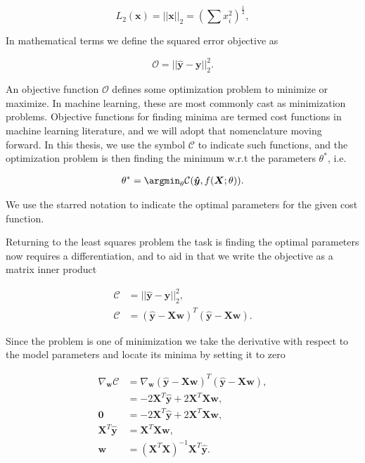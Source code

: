 $$L_2(\boldsymbol{x}) =||\boldsymbol{x}||_2 = \left(\sum x_i^2\right)^{\frac{1}{2}},$$

\noindent  In mathematical terms we define the squared error objective as

\begin{equation}
\mathcal{O} = || \boldsymbol{\hat{y}} - \boldsymbol{y} ||_2 ^2.
\end{equation}

\noindent An objective function $\mathcal{O}$ defines some optimization problem to minimize or maximize. In machine learning, these are most commonly cast as minimization problems. Objective functions for finding minima are termed cost functions in machine learning literature, and we will adopt that nomenclature moving forward. In this thesis, we use the symbol $\mathcal{C}$ to indicate such functions, and the optimization problem is then finding the minimum w.r.t the parameters $\theta^*$, i.e. 

\begin{align}\label{eq:cost}
\theta^* = \argmin_\theta \mathcal{C}(\boldsymbol{\hat{y}}, f(\boldsymbol{X}; \theta)).
\end{align}

\noindent We use the starred notation to indicate the optimal parameters for the given cost function.

Returning to the least squares problem the task is finding the optimal parameters now requires a differentiation, and to aid in that we write the objective as a matrix inner product 

\begin{align*}
\mathcal{C} &= || \boldsymbol{\hat{y}} - \boldsymbol{y} ||_2 ^2, \\
\mathcal{C} &= ( \boldsymbol{\hat{y}} - \boldsymbol{Xw})^T( \boldsymbol{\hat{y}} - \boldsymbol{Xw}).
\end{align*}

\noindent Since the problem is one of minimization we take the derivative with respect to the model parameters and locate its minima by setting it to zero 

\begin{align}
\nabla _{\boldsymbol{w}}\mathcal{C} &= \nabla _{\boldsymbol{w}} ( \boldsymbol{\hat{y}} - \boldsymbol{Xw})^T( \boldsymbol{\hat{y}} - \boldsymbol{Xw}), \\
&= -2\boldsymbol{X}^T\boldsymbol{\hat{y}} + 2\boldsymbol{X}^T\boldsymbol{X}\boldsymbol{w}, \\
\boldsymbol{0} &= -2\boldsymbol{X}^T\boldsymbol{\hat{y}} + 2\boldsymbol{X}^T\boldsymbol{X}\boldsymbol{w}, \\
\boldsymbol{X}^T\boldsymbol{\hat{y}} &= \boldsymbol{X}^T\boldsymbol{X}\boldsymbol{w}, \\
\boldsymbol{w} &=(\boldsymbol{X}^T\boldsymbol{X})^{-1} \boldsymbol{X}^T\boldsymbol{\hat{y}}. \label{eq:least_squares}
\end{align}

